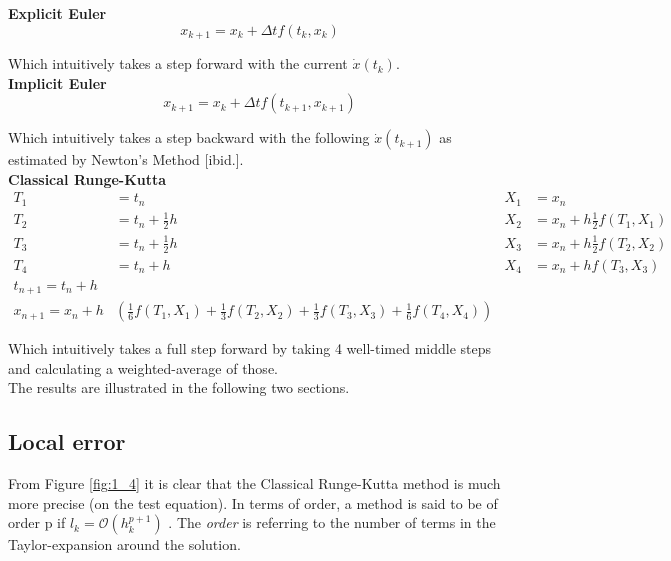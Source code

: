 \textbf{Explicit Euler \cite{JrgensenScientificEquationsb}}
\begin{equation}
    x_{k+1}=x_{k}+\Delta t f\left(t_{k}, x_{k}\right)
\end{equation}

Which intuitively takes a step forward with the current $\dot{x}(t_k)$.
\\
\textbf{Implicit Euler \cite{JrgensenScientificEquationsb}}
\begin{equation}
    x_{k+1}=x_{k}+\Delta t f\left(t_{k+1}, x_{k+1}\right)
\end{equation}

Which intuitively takes a step backward with the following $\dot{x}(t_{k+1})$ as estimated by Newton's Method [ibid.].
\\
\textbf{Classical Runge-Kutta \cite{JrgensenRunge-KuttaEquations}}
$$
\begin{aligned}
T_{1} &=t_{n} & X_{1} &=x_{n} \\
T_{2} &=t_{n}+\frac{1}{2} h & X_{2} &=x_{n}+h \frac{1}{2} f\left(T_{1}, X_{1}\right) \\
T_{3} &=t_{n}+\frac{1}{2} h & X_{3} &=x_{n}+h \frac{1}{2} f\left(T_{2}, X_{2}\right) \\
T_{4} &=t_{n}+h & X_{4} &=x_{n}+h f\left(T_{3}, X_{3}\right) \\
t_{n+1}=t_{n}+h & & \\
x_{n+1}=x_{n}+h &\left(\frac{1}{6} f\left(T_{1}, X_{1}\right)+\frac{1}{3} f\left(T_{2}, X_{2}\right)+\frac{1}{3} f\left(T_{3}, X_{3}\right)+\frac{1}{6} f\left(T_{4}, X_{4}\right)\right)
\end{aligned}
$$

Which intuitively takes a full step forward by taking 4 well-timed middle steps and calculating a weighted-average of those.
\\

The results are illustrated in the following two sections.






\subsection{Local error}
From Figure \ref{fig:1_4} it is clear that the Classical Runge-Kutta method is much more precise (on the test equation). In terms of order, a method is said to be of order p if $l_{k}=\mathcal{O}\left(h_{k}^{p+1}\right)$ \cite{JrgensenScientificEquationsc}. The \textit{order} is referring to the number of terms in the Taylor-expansion around the solution.

